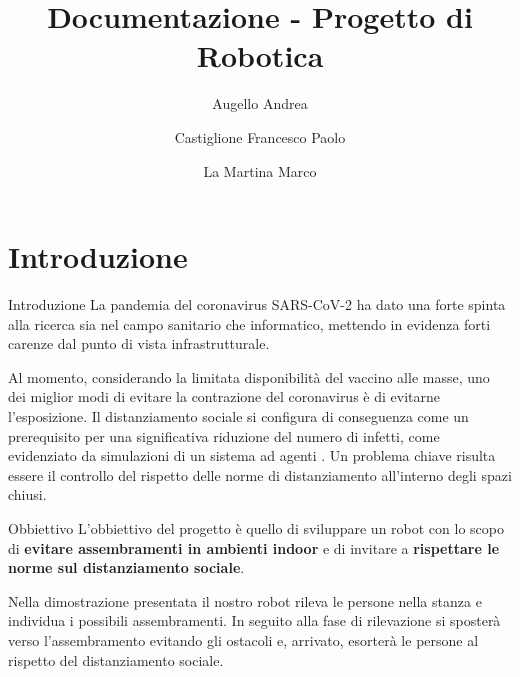 \documentclass[aspectratio=169, leqno]{beamer}
\author{Augello Andrea \and Castiglione Francesco Paolo \and La Martina Marco}
\institute{Università degli Studi di Palermo}
\begin{document}
\title[Chang'e]{Documentazione - Progetto di Robotica}
	\begin{frame}
		\titlepage
	\end{frame}


	\section{Introduzione}\label{sec:Introduzione}
	\frame{\sectionpage}
	\begin{frame}{Introduzione}
		La pandemia del coronavirus SARS-CoV-2 ha dato una forte
		spinta alla ricerca sia nel campo sanitario che informatico, mettendo in
		evidenza forti carenze dal punto di vista infrastrutturale.
		
		
		Al momento, considerando la limitata disponibilità del vaccino alle masse, uno dei miglior modi di evitare la contrazione del coronavirus è
		di evitarne l'esposizione. Il distanziamento sociale si configura di
		conseguenza come un prerequisito per una significativa riduzione del numero
		di infetti, come evidenziato da simulazioni di un sistema ad agenti
		\cite{silva2020covid}. Un problema chiave risulta essere
		il controllo del rispetto delle norme di distanziamento all'interno degli
		spazi chiusi. 
	\end{frame}

	\begin{frame}{Obbiettivo}
	L'obbiettivo del progetto è quello di sviluppare un robot con lo scopo di \textbf{evitare assembramenti in ambienti indoor} e di invitare a \textbf{rispettare le norme sul distanziamento sociale}. 
	
	Nella dimostrazione presentata il nostro robot rileva le persone nella stanza e individua i possibili assembramenti. In seguito alla fase di rilevazione si sposterà verso l'assembramento evitando gli ostacoli e, arrivato, esorterà le persone al rispetto del distanziamento sociale.
	\end{frame}
	
\end{document}
